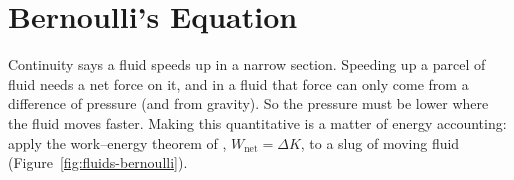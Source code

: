 \section{Bernoulli's Equation}\label{sec:bernoulli}

Continuity says a fluid speeds up in a narrow section. Speeding up a parcel of fluid needs a net force on
it, and in a fluid that force can only come from a difference of pressure (and from gravity). So the
pressure must be lower where the fluid moves faster. Making this quantitative is a matter of energy
accounting: apply the work--energy theorem of , $W_{\text{net}}=\Delta K$, to a slug of
moving fluid (Figure~\ref{fig:fluids-bernoulli}).

\begin{figure}[htbp]
\centering
{}
\end{figure}

